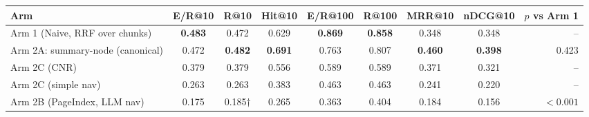 \begin{tabular}{l S[table-format=1.3] S[table-format=1.3] S[table-format=1.3] S[table-format=1.3] S[table-format=1.3] S[table-format=1.3] S[table-format=1.3] r}
\toprule
Arm & {E/R@10} & {R@10} & {Hit@10} & {E/R@100} & {R@100} & {MRR@10} & {nDCG@10} & {$p$ vs Arm 1} \\
\midrule
Arm 1 (Naive, RRF over chunks) & {\textbf{0.483}} & 0.472 & 0.629 & {\textbf{0.869}} & {\textbf{0.858}} & 0.348 & 0.348 & -- \\
Arm 2A: summary-node (canonical) & 0.472 & {\textbf{0.482}} & {\textbf{0.691}} & 0.763 & 0.807 & {\textbf{0.460}} & {\textbf{0.398}} & 0.423 \\
Arm 2C (CNR) & 0.379 & 0.379 & 0.556 & 0.589 & 0.589 & 0.371 & 0.321 & -- \\
Arm 2C (simple nav) & 0.263 & 0.263 & 0.383 & 0.463 & 0.463 & 0.241 & 0.220 & -- \\
Arm 2B (PageIndex, LLM nav) & 0.175 & {0.185$\dagger$} & 0.265 & 0.363 & 0.404 & 0.184 & 0.156 & $<0.001$ \\
\bottomrule
\end{tabular}
